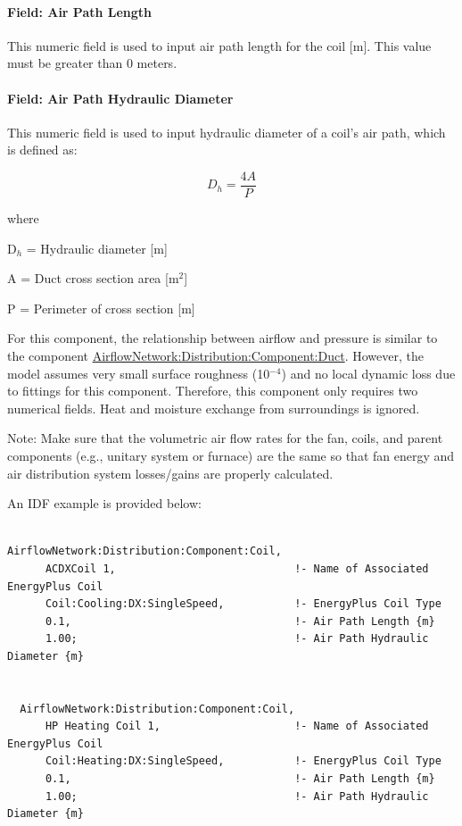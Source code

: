 \paragraph{Field: Air Path Length}\label{field-air-path-length}

This numeric field is used to input air path length for the coil {[}m{]}. This value must be greater than 0 meters.

\paragraph{Field: Air Path Hydraulic Diameter}\label{field-air-path-hydraulic-diameter}

This numeric field is used to input hydraulic diameter of a coil's air path, which is defined as:

\begin{equation}
{D_h} = \frac{{4A}}{P}
\end{equation}

where

D\(_{h}\) = Hydraulic diameter {[}m{]}

A = Duct cross section area {[}m\(^{2}\){]}

P = Perimeter of cross section {[}m{]}

For this component, the relationship between airflow and pressure is similar to the component \hyperref[airflownetworkdistributioncomponentduct]{AirflowNetwork:Distribution:Component:Duct}. However, the model assumes very small surface roughness (10\(^{-4}\)) and no local dynamic loss due to fittings for this component. Therefore, this component only requires two numerical fields. Heat and moisture exchange from surroundings is ignored.

Note: Make sure that the volumetric air flow rates for the fan, coils, and parent components (e.g., unitary system or furnace) are the same so that fan energy and air distribution system losses/gains are properly calculated.

An IDF example is provided below:

\begin{lstlisting}

AirflowNetwork:Distribution:Component:Coil,
      ACDXCoil 1,                            !- Name of Associated EnergyPlus Coil
      Coil:Cooling:DX:SingleSpeed,           !- EnergyPlus Coil Type
      0.1,                                   !- Air Path Length {m}
      1.00;                                  !- Air Path Hydraulic Diameter {m}


  AirflowNetwork:Distribution:Component:Coil,
      HP Heating Coil 1,                     !- Name of Associated EnergyPlus Coil
      Coil:Heating:DX:SingleSpeed,           !- EnergyPlus Coil Type
      0.1,                                   !- Air Path Length {m}
      1.00;                                  !- Air Path Hydraulic Diameter {m}
\end{lstlisting}

